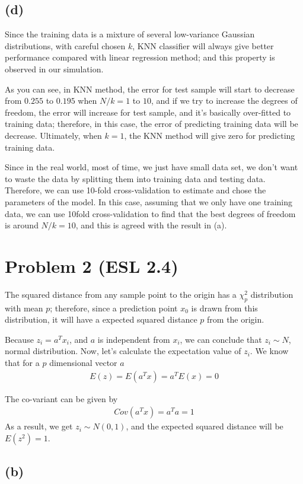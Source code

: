\documentclass[pra,groupedaddress,amsmath,amssymb, column]{revtex4}
\begin{document}
\subsection*{(d)}
Since the training data is a mixture of several low-variance Gaussian distributions, with careful chosen $k$, KNN classifier will always give better performance compared with linear regression method; and this property is observed in our simulation. 

As you can see, in KNN method, the error for test sample will start to decrease from $0.255$ to $0.195$ when $N/k=1$ to $10$, and if we try to increase the degrees of freedom, the error will increase for test sample, and it's basically over-fitted to training data; therefore, in this case, the error of predicting training data will be decrease. Ultimately, when $k=1$, the KNN method will give zero for predicting training data.

Since in the real world, most of time, we just have small data set, we don't want to waste the data by splitting them into training data and testing data. Therefore, we can use 10-fold cross-validation to estimate and chose the parameters of the model. In this case, assuming that we only have one training data, we can use 10fold cross-validation to find that the best degrees of freedom is around $N/k=10$, and this is agreed with the result in (a).

\section*{Problem 2 (ESL 2.4)}
The squared distance from any sample point to the origin has a $\chi_p^2$ distribution with mean $p$; therefore, since a prediction point $x_0$ is drawn from this distribution, it will have a expected squared distance $p$ from the origin. 

Because $z_i=a^Tx_i$, and $a$ is independent from $x_i$, we can conclude that $z_i \sim N$, normal distribution. Now, let's calculate the expectation value of $z_i$. We know that for a $p$ dimensional vector $a$ 
\begin{align}
E(z) = E(a^Tx) = a^TE(x) = 0
\end{align}

The co-variant can be given by
\begin{align}
Cov(a^Tx) = a^Ta = 1
\end{align}
As a result, we get $z_i \sim N(0,1)$, and the expected squared distance will be $E(z^2) = 1$.

\subsection*{(b)}
\end{document}

